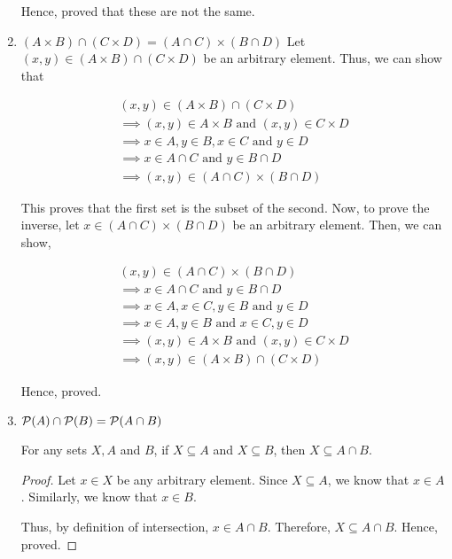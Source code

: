\begin{enumerate}
				Hence, proved that these are not the same.
			\es

		\item $(A \times B) \cap (C \times D) = (A \cap C) \times (B \cap D)$
			\bs
				Let $(x, y) \in (A \times B) \cap (C \times D)$ be an arbitrary element. Thus, we can show that

				\begin{align}
					(x, y) \in (A \times B) \cap (C \times D) \\
					\implies (x, y) \in A \times B \text{ and } (x, y) \in C \times D \\
					\implies x \in A, y \in B, x \in C \text{ and } y \in D \\
					\implies x \in A \cap C \text{ and } y \in B \cap D \\
					\implies (x, y) \in (A \cap C) \times (B \cap D)
				\end{align}

				This proves that the first set is the subset of the second.
				Now, to prove the inverse, let $x \in (A \cap C) \times (B \cap D)$ be an arbitrary element. Then, we can show,

				\begin{align}
					(x, y) \in (A \cap C) \times (B \cap D) \\
					\implies x \in A \cap C \text{ and } y \in B \cap D \\
					\implies x \in A, x \in C, y \in B \text{ and } y \in D \\
					\implies x \in A, y \in B \text{ and } x \in C, y \in D \\
					\implies (x, y) \in A \times B \text{ and } (x, y) \in C \times D \\
					\implies (x, y) \in (A \times B) \cap (C \times D)
				\end{align}

				Hence, proved.
			\es


		\item $\mathcal{P}(A) \cap \mathcal{P}(B) = \mathcal{P}(A \cap B)$
			\bs
				\begin{lemma}\label{intersub}
					For any sets $X, A$ and $B$, if $X \subseteq A$ and $X \subseteq B$, then $X \subseteq A \cap B$.
				\end{lemma}
				\begin{proof}
					Let $x \in X$ be any arbitrary element.
					Since $X \subseteq A$, we know that $x \in A$.
					Similarly, we know that $x \in B$.

					Thus, by definition of intersection, $x \in A \cap B$. 
					Therefore, $X \subseteq A \cap B$. Hence, proved.
				\end{proof}



\end{enumerate}
